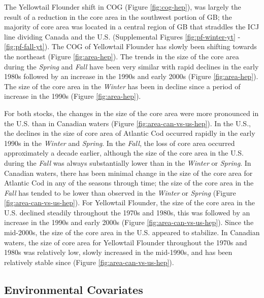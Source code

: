 \documentclass[
]{article}
\begin{document}
The Yellowtail Flounder shift in COG (Figure \ref{fig:cog-hep}), was largely the result of a reduction in the core area in the southwest portion of GB; the majority of core area was located in a central region of GB that straddles the ICJ line dividing Canada and the U.S. (Supplemental Figures \ref{fig:pf-winter-yt} -\ref{fig:pf-fall-yt}). The COG of Yellowtail Flounder has slowly been shifting towards the northeast (Figure \ref{fig:area-hep}). The trends in the size of the core area during the \emph{Spring} and \emph{Fall} have been very similar with rapid declines in the early 1980s followed by an increase in the 1990s and early 2000s (Figure \ref{fig:area-hep}). The size of the core area in the \emph{Winter} has been in decline since a period of increase in the 1990s (Figure \ref{fig:area-hep}).

For both stocks, the changes in the size of the core area were more pronounced in the U.S. than in Canadian waters (Figure \ref{fig:area-can-vs-us-hep}). In the U.S., the declines in the size of core area of Atlantic Cod occurred rapidly in the early 1990s in the \emph{Winter} and \emph{Spring}. In the \emph{Fall}, the loss of core area occurred approximately a decade earlier, although the size of the core area in the U.S. during the \emph{Fall} was always substantially lower than in the \emph{Winter} or \emph{Spring}. In Canadian waters, there has been minimal change in the size of the core area for Atlantic Cod in any of the seasons through time; the size of the core area in the \emph{Fall} has tended to be lower than observed in the \emph{Winter} or \emph{Spring} (Figure \ref{fig:area-can-vs-us-hep}). For Yellowtail Flounder, the size of the core area in the U.S. declined steadily throughout the 1970s and 1980s, this was followed by an increase in the 1990s and early 2000s (Figure \ref{fig:area-can-vs-us-hep}). Since the mid-2000s, the size of the core area in the U.S. appeared to stabilize. In Canadian waters, the size of core area for Yellowtail Flounder throughout the 1970s and 1980s was relatively low, slowly increased in the mid-1990s, and has been relatively stable since (Figure \ref{fig:area-can-vs-us-hep}).

\hypertarget{environmental-covariates-1}{%
\subsection{Environmental Covariates}\label{environmental-covariates-1}}
\end{document}
